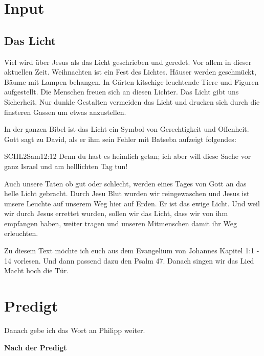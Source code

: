 \section{ Input }
\begin{spacing}{1.5}
\subsection{ Das Licht }

Viel wird über Jesus als das Licht geschrieben und geredet. Vor allem in dieser aktuellen Zeit. Weihnachten ist ein Fest des Lichtes. Häuser werden geschmückt, Bäume mit Lampen behangen. In Gärten kitschige leuchtende Tiere und Figuren aufgestellt. Die Menschen freuen sich an diesen Lichter. Das Licht gibt uns Sicherheit. Nur dunkle Gestalten vermeiden das Licht und drucken sich durch die finsteren Gassen um etwas anzustellen. 

In der ganzen Bibel ist das Licht ein Symbol von Gerechtigkeit und Offenheit. Gott sagt zu David, als er ihm sein Fehler mit Batseba aufzeigt folgendes:

\begin{bibeltext}{SCHL}{2Sam}{12:12}
Denn du hast es heimlich getan; ich aber will diese Sache vor ganz Israel und am helllichten Tag tun!
\end{bibeltext}

Auch unsere Taten ob gut oder schlecht, werden eines Tages von Gott an das helle Licht gebracht.
Durch Jesu Blut wurden wir reingewaschen und Jesus ist unsere Leuchte auf unserem Weg hier auf Erden. Er ist das ewige Licht. Und weil wir durch Jesus errettet wurden, sollen wir das Licht, dass wir von ihm empfangen haben, weiter tragen und unseren Mitmenschen damit ihr Weg erleuchten.

Zu diesem Text möchte ich euch aus dem Evangelium von Johannes Kapitel 1:1 - 14 vorlesen.
Und dann passend dazu den Psalm 47. Danach singen wir das Lied Macht hoch die Tür.

\end{spacing}


\section{Predigt}

Danach gebe ich das Wort an Philipp weiter.

\textbf{Nach der Predigt}

